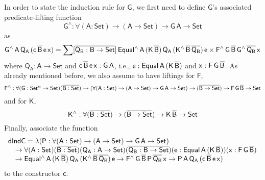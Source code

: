 \documentclass[9pt]{entcs}
\begin{document}
In order to state the induction rule for $\mathsf{G}$,
we first need to define $\mathsf{G}$'s associated predicate-lifting function 
\[
\mathsf{G^{\wedge} : \forall (A : Set) \to (A \to Set) \to G\,A \to Set}
\]
as
\[
\mathsf{G^{\wedge}\,A\,Q_A\,(c\,\overline{B}\,e\,x)
= \sum [\overline{Q_B : B \to Set}]\,
Equal^{\wedge}\,A\,(K\,\overline{B})\,Q_A\,(K^{\wedge}\,\overline{B}\,\overline{Q_B})\,e
\times F^{\wedge}\,G\,\overline{B}\,G^{\wedge}\,{\overline{Q_B}}\,x}
\]
where $\mathsf{Q_A : A \to Set}$
and $\mathsf{c\,\overline{B}\,e\,x : G\,A}$,
i.e., $\mathsf{e : Equal\,A\,(K\,\overline{B})}$ and $\mathsf{x : F\,G\,\overline{B}}$.
As already mentioned before, we also assume to have liftings for $\mathsf{F}$,
\[
\mathsf{F^{\wedge} : \forall (G : Set^{\alpha} \to Set) (\overline{B : Set})
\to (\forall (A : Set) \to (A \to Set) \to G\,A \to Set)
\to (\overline{B \to Set})
\to F\,G\,\overline{B} \to Set}
\]
and for  $\mathsf{K}$,
\[
\mathsf{K^{\wedge} : \forall (\overline{B : Set}) \to (\overline{B \to Set}) \to K\,\overline{B} \to Set}
\]
Finally, associate the function
\[
\begin{array}{l}
\mathsf{dIndC = \lambda (P : \forall (A : Set) \to (A \to Set) \to G\,A \to Set)} \\
\quad \mathsf{\to \forall (A : Set) (\overline{B : Set}) (Q_A : A \to Set) (\overline{Q_B : B \to Set}) (e : Equal\,A\,(K\,\overline{B})) (x : F\,G\,\overline{B})} \\
\quad \mathsf{\to Equal^{\wedge}\,A\,(K\,\overline{B})\,Q_A\,(K^{\wedge}\,\overline{B}\,\overline{Q_B})\,e
	\to F^{\wedge}\,G\,\overline{B}\,P\,\overline{Q_B}\,x
	\to P\,A\,Q_A\,(c\,\overline{B}\,e\,x)}
\end{array}
\]
to the constructor $\mathsf{c}$.
\end{document}
